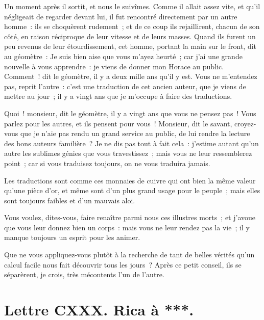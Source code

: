 \documentclass[french,twoside]{book} %
\newcommand{\dateline}[1]{\medskip{\RaggedLeft{#1}\par}\bigskip}
\begin{document}
Un moment après il sortit, et nous le suivîmes. Comme il allait assez vite, et qu’il négligeait de regarder devant lui, il fut rencontré directement par un autre homme : ils se choquèrent rudement ; et de ce coup ils rejaillirent, chacun de son côté, en raison réciproque de leur vitesse et de leurs masses. Quand ils furent un peu revenus de leur étourdissement, cet homme, portant la main sur le front, dit au géomètre : Je suis bien aise que vous m’ayez heurté ; car j’ai une grande nouvelle à vous apprendre : je viens de donner mon Horace au public. Comment ! dit le géomètre, il y a deux mille ans qu’il y est. Vous ne m’entendez pas, reprit l’autre : c’est une traduction de cet ancien auteur, que je viens de mettre au jour ; il y a vingt ans que je m’occupe à faire des traductions.\par
Quoi ! monsieur, dit le géomètre, il y a vingt ans que vous ne pensez pas ! Vous parlez pour les autres, et ils pensent pour vous ! Monsieur, dit le savant, croyez-vous que je n’aie pas rendu un grand service au public, de lui rendre la lecture des bons auteurs familière ? Je ne dis pas tout à fait cela : j’estime autant qu’un autre les sublimes génies que vous travestissez ; mais vous ne leur ressemblerez point ; car si vous traduisez toujours, on ne vous traduira jamais.\par
Les traductions sont comme ces monnaies de cuivre qui ont bien la même valeur qu’une pièce d’or, et même sont d’un plus grand usage pour le peuple ; mais elles sont toujours faibles et d’un mauvais aloi.\par
Vous voulez, dites-vous, faire renaître parmi nous ces illustres morts ; et j’avoue que vous leur donnez bien un corps : mais vous ne leur rendez pas la vie ; il y manque toujours un esprit pour les animer.\par
Que ne vous appliquez-vous plutôt à la recherche de tant de belles vérités qu’un calcul facile nous fait découvrir tous les jours ? Après ce petit conseil, ils se séparèrent, je crois, très mécontents l’un de l’autre.\par

\dateline{De Paris, le dernier de la lune de Rebiab 2, 1719.}
\section[{Lettre CXXX. Rica à ***.}]{Lettre CXXX. Rica à ***.}\renewcommand{\leftmark}{Lettre CXXX. Rica à ***.}
\end{document}
